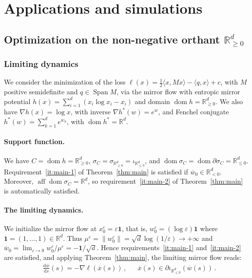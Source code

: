 \documentclass[11pt,english,reqno]{article}
\DeclareMathOperator{\Span}{Span}
\DeclareMathOperator{\dom}{dom}
\DeclareMathOperator{\aff}{aff}
\newcommand{\diff}{\mathrm{d}}
\newcommand{\R}{\mathbb{R}}
\renewcommand{\leq}{\leqslant}
\renewcommand{\geq}{\geqslant}
\theoremstyle{plain}
\theoremstyle{definition}
\theoremstyle{remark}
\numberwithin{equation}{section}
\begin{document}
\section{Applications and simulations}
\label{sec:examples}

\subsection{Optimization on the non-negative orthant \texorpdfstring{$\R_{\geq 0}^d$}{}}
\label{subsec:diagonal}

\subsubsection{Limiting dynamics}
 
We consider the minimization of the loss $\ell(x) = \frac{1}{2} \langle x, M x \rangle - \langle q, x \rangle + c$, with $M$ positive semidefinite and $q \in \Span M$, via the mirror flow with entropic mirror potential $h(x) = \sum_{i=1}^{d} (x_i \log x_i - x_i)$ and domain $\dom h = \R_{\geq 0}^d$. We also have $\nabla h(x) = \log x$, with inverse $\nabla h^*(w) = e^w$, and Fenchel conjugate $h^*(w) = \sum_{k = 1}^d e^{w_k}$, with $\dom h^* = \R^d$.
 
\paragraph{Support function.} We have $C = \dom h = \R_{\geq 0}^d$, $\sigma_{C} = \sigma_{\R_{\geq 0}^d} = \iota_{\R_{\leq 0}^d}$, and $\dom \sigma_C = \dom \partial \sigma_C = \R_{\leq 0}^d$. Requirement~\ref{it:main-1} of Theorem~\ref{thm:main} is satisfied if $\overline{w}_0 \in \R_{< 0}^d$. Moreover, $\aff \dom \sigma_C = \R^d$, so requirement~\ref{it:main-2} of Theorem~\ref{thm:main} is automatically satisfied.
%
\paragraph{The limiting dynamics.} We initialize the mirror flow at $x_0^\varepsilon = \varepsilon \mathbf{1}$, that is, $w_0^\varepsilon = (\log \varepsilon)\mathbf{1}$ where $\mathbf{1} = (1, \ldots, 1) \in \R^d$. Thus $\mu^\varepsilon = \|w_0^\varepsilon\| = \sqrt{d}\log(1/\varepsilon) \to +\infty$ and $\overline{w}_0 = \lim_{\varepsilon \to 0} w_0^\varepsilon / \mu^\varepsilon = -\mathbf{1}/\sqrt{d}$. Hence requirements~\ref{it:main-1} and~\ref{it:main-2} are satisfied, and applying Theorem~\ref{thm:main}, the limiting mirror flow reads:
%
\begin{align}
	\label{eq:diagonal-limit-dual}
	&\frac{\diff \overline{w}}{\diff s} (s) = - \nabla \ell(\overline{x}(s))  \, , &&\overline{x}(s) \in \partial \iota_{\R_{\leq 0}^d}(\overline{w}(s)) \, .
\end{align}
%
\end{document}
